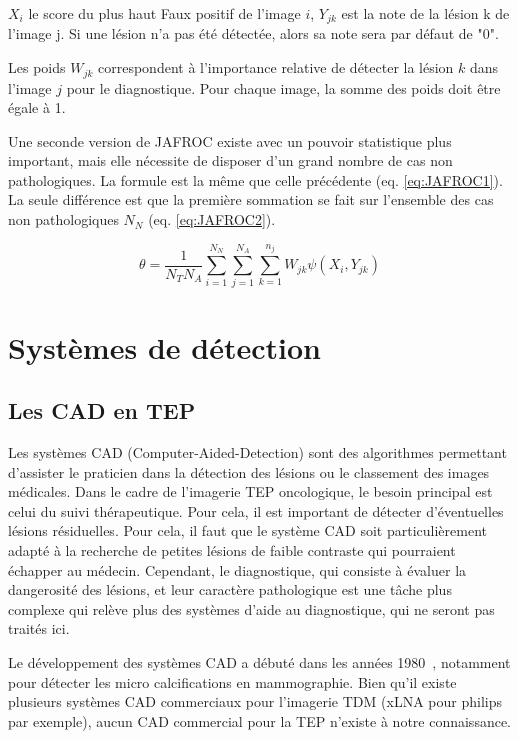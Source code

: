 $X_i$ le score du plus haut Faux positif de l'image $i$, $Y_{jk}$ est la note de la lésion k de l'image j. Si une lésion n'a pas été détectée, alors sa note sera par défaut de "0".

Les poids $W_{jk}$ correspondent à l'importance relative de détecter la lésion $k$ dans l'image $j$ pour le diagnostique. Pour chaque image, la somme des poids doit être égale à 1.

Une seconde version de JAFROC existe avec un pouvoir statistique plus important, mais elle nécessite de disposer d'un grand nombre de cas non pathologiques. La formule est la même que celle précédente (eq. \ref{eq:JAFROC1}). La seule différence est que la première sommation se fait sur l'ensemble des cas non pathologiques $N_N$ (eq. \ref{eq:JAFROC2}).

\begin{equation}
\label{eq:JAFROC2}
\theta=\frac{1}{N_T N_A} \sum_{i=1}^{N_N} \sum_{j=1}^{N_A} \sum_{k=1}^{n_j} W_{jk} \psi(X_i, Y_{jk})
\end{equation}


\chapter{Systèmes de détection}

	\section{Les CAD en TEP}

Les systèmes CAD (Computer-Aided-Detection) sont des algorithmes permettant d'assister le praticien dans la détection des lésions ou le classement des images médicales. Dans le cadre de l'imagerie TEP oncologique, le besoin principal est celui du suivi thérapeutique. Pour cela, il est important de détecter d'éventuelles lésions résiduelles. Pour cela, il faut que le système CAD soit particulièrement adapté à la recherche de petites lésions de faible contraste qui pourraient échapper au médecin. Cependant, le diagnostique, qui consiste à évaluer la dangerosité des lésions, et leur caractère pathologique est une tâche plus complexe qui relève plus des systèmes d'aide au diagnostique, qui ne seront pas traités ici.

Le développement des systèmes CAD a débuté dans les années 1980~\cite{chan1987image}, notamment pour détecter les micro calcifications en mammographie. Bien qu'il existe plusieurs systèmes CAD commerciaux pour l'imagerie TDM (xLNA pour philips par exemple), aucun CAD commercial pour la TEP n'existe à notre connaissance.

